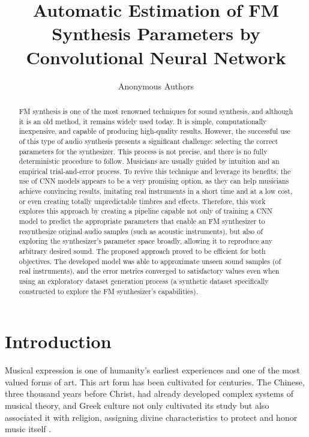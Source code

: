 \documentclass[10pt,conference]{IEEEtran}
\title{\LARGE \bf
Automatic Estimation of FM Synthesis Parameters by Convolutional Neural Network
}
\begin{document}
\author{Anonymous Authors}

\maketitle
\thispagestyle{empty}
\pagestyle{empty}


\begin{abstract}
FM synthesis is one of the most renowned techniques for sound synthesis, and although it is an old method, it remains widely used today. It is simple, computationally inexpensive, and capable of producing high-quality results. However, the successful use of this type of audio synthesis presents a significant challenge: selecting the correct parameters for the synthesizer. This process is not precise, and there is no fully deterministic procedure to follow. Musicians are usually guided by intuition and an empirical trial-and-error process. To revive this technique and leverage its benefits, the use of CNN models appears to be a very promising option, as they can help musicians achieve convincing results, imitating real instruments in a short time and at a low cost, or even creating totally unpredictable timbres and effects. Therefore, this work explores this approach by creating a pipeline capable not only of training a CNN model to predict the appropriate parameters that enable an FM synthesizer to resynthesize original audio samples (such as acoustic instruments), but also of exploring the synthesizer’s parameter space broadly, allowing it to reproduce any arbitrary desired sound. The proposed approach proved to be efficient for both objectives. The developed model was able to approximate unseen sound samples (of real instruments), and the error metrics converged to satisfactory values even when using an exploratory dataset generation process (a synthetic dataset specifically constructed to explore the FM synthesizer’s capabilities).
\end{abstract}


\section{Introduction}

Musical expression is one of humanity’s earliest experiences and one of the most valued forms of art. This art form has been cultivated for centuries. The Chinese, three thousand years before Christ, had already developed complex systems of musical theory, and Greek culture not only cultivated its study but also associated it with religion, assigning divine characteristics to protect and honor music itself \cite{med1996teoria}.
\end{document}
